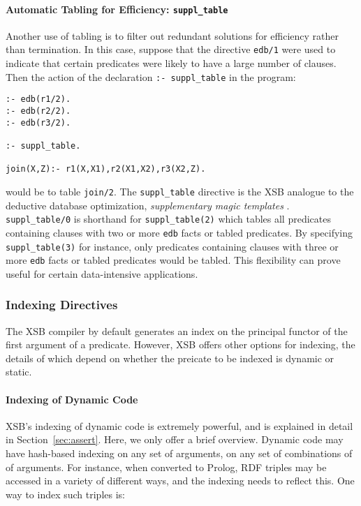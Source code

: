\paragraph{Automatic Tabling for Efficiency: {\tt suppl\_table}}
Another use of tabling is to filter out redundant solutions for
efficiency rather than termination.  In this case, suppose that the
directive {\tt edb/1} were used to indicate that certain predicates were
likely to have a large number of clauses.  Then the action of the declaration
{\tt :- suppl\_table} in the program:
\begin{verbatim}
:- edb(r1/2).
:- edb(r2/2).
:- edb(r3/2).

:- suppl_table.

join(X,Z):- r1(X,X1),r2(X1,X2),r3(X2,Z).
\end{verbatim}
would be to table {\tt join/2}.  The {\tt suppl\_table} directive is
the XSB analogue to the deductive database optimization, {\em
supplementary magic templates} \cite{BeRa91}.  {\tt suppl\_table/0} is
shorthand for {\tt suppl\_table(2)} which tables all predicates
containing clauses with two or more {\tt edb} facts or tabled
predicates.  By specifying {\tt suppl\_table(3)} for instance, only
predicates containing clauses with three or more {\tt edb} facts or
tabled predicates would be tabled.  This flexibility can prove useful
for certain data-intensive applications.


\subsubsection{Indexing Directives}\label{indexing_directives}

The XSB compiler by default generates an index on the principal
functor of the first argument of a predicate.  However, XSB offers
other options for indexing, the details of which depend on whether the
preicate to be indexed is dynamic or static. 

\paragraph{Indexing of Dynamic Code}
XSB's indexing of dynamic code is extremely powerful, and is explained
in detail in Section~\ref{sec:assert}.  Here, we only offer a brief
overview.  Dynamic code may have hash-based indexing on any set of
arguments, on any set of combinations of of arguments.  For instance,
when converted to Prolog, RDF triples may be accessed in a variety of
different ways, and the indexing needs to reflect this.  One way to
index such triples is:


